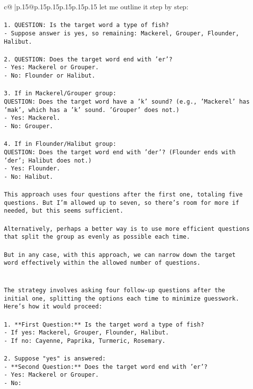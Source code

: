 \documentclass{article}
\begin{document}
{\begin{supertabular}{c@{$\;$}|p{.15\linewidth}@{}p{.15\linewidth}p{.15\linewidth}p{.15\linewidth}p{.15\linewidth}p{.15\linewidth}}
{{{let me outline it step by step:\\ \tt \\ \tt 1. QUESTION: Is the target word a type of fish?\\ \tt    - Suppose answer is yes, so remaining: Mackerel, Grouper, Flounder, Halibut.\\ \tt \\ \tt 2. QUESTION: Does the target word end with 'er'?\\ \tt    - Yes: Mackerel or Grouper.\\ \tt    - No: Flounder or Halibut.\\ \tt \\ \tt 3. If in Mackerel/Grouper group:\\ \tt    QUESTION: Does the target word have a 'k' sound? (e.g., 'Mackerel' has 'mak', which has a 'k' sound. 'Grouper' does not.)\\ \tt      - Yes: Mackerel.\\ \tt      - No: Grouper.\\ \tt \\ \tt 4. If in Flounder/Halibut group:\\ \tt    QUESTION: Does the target word end with 'der'? (Flounder ends with 'der'; Halibut does not.)\\ \tt      - Yes: Flounder.\\ \tt      - No: Halibut.\\ \tt \\ \tt This approach uses four questions after the first one, totaling five questions. But I'm allowed up to seven, so there's room for more if needed, but this seems sufficient.\\ \tt \\ \tt Alternatively, perhaps a better way is to use more efficient questions that split the group as evenly as possible each time.\\ \tt \\ \tt But in any case, with this approach, we can narrow down the target word effectively within the allowed number of questions.\\ \tt \\ \tt \\ \tt The strategy involves asking four follow-up questions after the initial one, splitting the options each time to minimize guesswork. Here's how it would proceed:\\ \tt \\ \tt 1. **First Question:** Is the target word a type of fish?\\ \tt    - If yes: Mackerel, Grouper, Flounder, Halibut.\\ \tt    - If no: Cayenne, Paprika, Turmeric, Rosemary.\\ \tt \\ \tt 2. Suppose "yes" is answered:\\ \tt    - **Second Question:** Does the target word end with 'er'?\\ \tt      - Yes: Mackerel or Grouper.\\ \tt      - No: }}}
\end{supertabular}}
\end{document}
